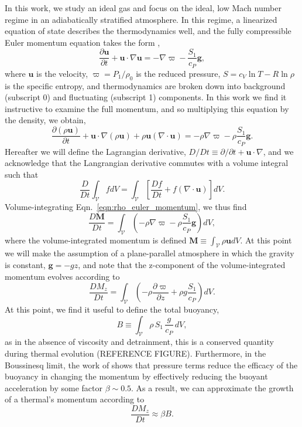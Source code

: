 \documentclass[twocolumn, amsmath, amsfonts, amssymb, trackchanges]{aastex62}
\newcommand{\DivU}{\ensuremath{\nabla\cdot\bm{u}}}
\newcommand{\grad}{\ensuremath{\nabla}}
\begin{document}
In this work, we study an ideal gas and 
focus on the ideal, low Mach number regime in an adiabatically
stratified atmosphere. In this regime, a linearized equation of state describes
the thermodynamics well, and the fully compressible Euler momentum equation
takes the form \citep{brown&all2012},
\begin{equation}
\frac{\partial \bm{u}}{\partial t} + \bm{u}\cdot\grad\bm{u} = 
-\grad\varpi - \frac{S_1}{c_P}\bm{g},
\label{eqn:euler_momentum}
\end{equation}
where $\bm{u}$ is the velocity, $\varpi = P_1 / \rho_0$ is the reduced pressure,
$S = c_V\ln T - R\ln\rho$ is the specific entropy, and thermodynamics are broken
down into background (subscript 0) and fluctuating (subscript 1) components.
In this work we find it instructive to examine the full momentum, and so multiplying
this equation by the density, we obtain,
\begin{equation}
\frac{\partial (\rho\bm{u})}{\partial t} + \bm{u}\cdot\grad(\rho\bm{u}) + \rho\bm{u}(\DivU)
= -\rho\grad\varpi - \rho\frac{S_1}{c_P}\bm{g}.
\label{eqn:rho_euler_momentum}
\end{equation}
Hereafter we will define the Lagrangian derivative,
$D/Dt \equiv \partial/\partial t + \bm{u}\cdot\grad$, and we acknowledge that 
the Langrangian derivative commutes with a volume integral such that
\begin{equation*}
\frac{D}{Dt}\int_{\mathcal{V}} f dV = \int_{\mathcal{V}} \left[\frac{Df}{Dt} + f(\DivU)\right]dV.
\end{equation*}
Volume-integrating Eqn.~\ref{eqn:rho_euler_momentum}, we thus find
\begin{equation}
\frac{D\bm{M}}{Dt} = \int_{\mathcal{V}}\left(-\rho\grad\varpi - \rho\frac{S_1}{c_P}\bm{g}\right)dV,
\label{eqn:int_momentum_eqn}
\end{equation}
where the volume-integrated momentum is defined $\bm{M} \equiv \int_{\mathcal{V}}\rho\bm{u} dV$.
At this point we will make the assumption of a plane-parallel atmosphere in which the gravity
is constant, $\bm{g} = -g\hat{z}$, and note that the z-component of the volume-integrated
momentum evolves according to
\begin{equation}
\frac{D M_z}{Dt} = \int_{\mathcal{V}}\left( -\rho\frac{\partial \varpi}{\partial z} + \rho g \frac{S_1}{c_P} \right)dV.
\label{eqn:Mz_definition}
\end{equation}
At this point, we find it useful to define the total buoyancy,
\begin{equation}
B \equiv \int_{\mathcal{V}} \rho\, S_1\, \frac{g}{c_P}\, dV,
\label{eqn:tot_buoyancy}
\end{equation}
as in the absence of viscosity and detrainment, this is a conserved quantity during
thermal evolution (REFERENCE FIGURE). Furthermore, in the Boussinesq limit, the
work of \citet{tarshish&all2018} shows that pressure terms reduce the efficacy of
the buoyancy in changing the momentum by effectively reducing the buoyant acceleration
by some factor $\beta \sim 0.5$. As a result, we can approximate the growth of a thermal's
momentum according to
\begin{equation}
\frac{D M_z}{Dt} \approx \beta B.
\label{eqn:theory_momentum}
\end{equation}
\end{document}
